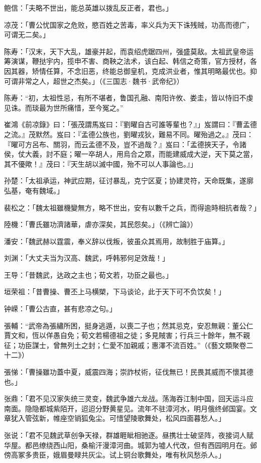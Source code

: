 鲍信：「夫略不世出，能总英雄以拨乱反正者，君也。」

凉茂：「曹公忧国家之危败，愍百姓之苦毒，率义兵为天下诛残贼，功高而德广，可谓无二矣。」

陈寿：「汉末，天下大乱，雄豪并起，而袁绍虎踞四州，强盛莫敌。太祖武皇帝运筹演谋，鞭挞宇内，揽申不害、商鞅之法术，该白起、韩信之奇策，官方授材，各因其器，矫情任算，不念旧恶，终能总御皇机，克成洪业者，惟其明略最优也。抑可谓非常之人，超世之杰矣。」（《三国志·魏书·武帝纪》）

陈寿：“初，太祖性忌，有所不堪者，鲁国孔融、南阳许攸、娄圭，皆以恃旧不虔见诛。而琰最为世所痛惜，至今冤之。”

崔鴻《前凉錄》曰：「張茂謂馬岌曰：『劉曜自古可誰等輩也？』」岌謂曰：『曹孟德之流。』茂默然。岌曰：『孟德公族也，劉曜戎狄，難易不同。曜殆過之。』茂曰：『曜可方呂布、關羽，而云孟德不及，豈不過哉？』岌曰：「孟德挾天子，令諸侯，仗大義，討不庭；曜一卒胡人，用烏合之眾，而能建威成大逆，天下莫之當，其不優歟！』茂曰：『天生胡以滅中國，殆不可以人事論也。』」

孙楚：「太祖承运，神武应期，征讨暴乱，克宁区夏；协建灵符，天命既集，遂廓弘基，奄有魏域。」

裴松之：「魏太祖雖機變無方，略不世出，安有以數千之兵，而得逾時相抗者哉？」

陸機：「曹氏雖功濟諸華，虐亦深矣，其民怨矣。」（《辨亡論》）

潘安：「魏武赫以霆震，奉义辞以伐叛，彼虽众其焉用，故制胜于庙算。」

刘渊：「大丈夫当为汉高、魏武，呼韩邪何足效哉！」

王导：「昔魏武，达政之主也；荀文若，功臣之最也。」

垣荣祖：「昔曹操、曹丕上马横槊，下马谈论，此于天下可不负饮矣！」

钟嵘：「曹公古直，甚有悲凉之句。」

張輔：“武帝為張繡所困，挺身逃遁，以喪二子也；然其忌克，安忍無親：董公仁賈文和，恆以佯愚自免；荀文若楊德祖之徒；多見賊害；行兵三十餘年，無不親征；功臣謀士，曾無列土之封；仁愛不加親戚；惠澤不流百姓。”（《藝文類聚卷二十二》）

張悌：「曹操雖功蓋中夏，威震四海；崇詐杖術，征伐無已！民畏其威而不懷其德也。」

张鼎：「君不见汉家失统三灵变，魏武争雄六龙战。荡海吞江制中国，回天运斗应南面。隐隐都城紫陌开，迢迢分野黄星见。流年不驻漳河水，明月俄终邺国宴。文章犹入管弦新，帷座空销狐兔尘。可惜望陵歌舞处，松风四面暮愁人。」

张说：「君不见魏武草创争天禄，群雄睚眦相驰逐。昼携壮士破坚阵，夜接词人赋华屋。都邑缭绕西山阳，桑榆汗漫漳河曲。城郭为墟人代改，但有西园明月在。邺傍高冢多贵臣，娥眉曼睩共灰尘。试上铜台歌舞处，唯有秋风愁杀人。」

